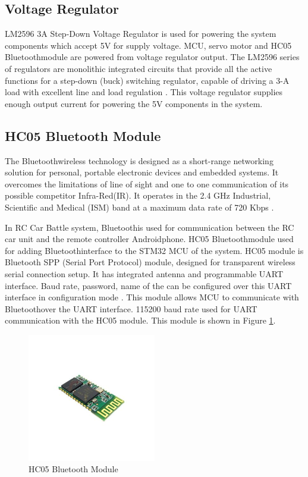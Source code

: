 \subsection{Voltage Regulator}
LM2596 3A Step-Down Voltage Regulator is used for powering the system components which accept 5V for supply voltage. MCU, servo motor and HC05 Bluetooth\texttrademark\;module are powered from voltage regulator output. The LM2596 series of regulators are monolithic
integrated circuits that provide all the active functions for a step-down (buck) switching regulator, capable of driving a 3-A load with excellent line and load
regulation \cite{Three}. This voltage regulator supplies enough output current for powering the 5V components in the system.

\subsection{HC05 Bluetooth Module} \label{sec_hc05_module}
The Bluetooth\texttrademark\;wireless technology is designed as a short-range networking solution for personal, portable electronic devices and embedded systems. It overcomes the limitations of line of sight and one to one communication of its possible competitor Infra-Red(IR). It operates in the 2.4 GHz Industrial, Scientific and Medical (ISM) band at a maximum data rate of 720 Kbps \cite{Bluetooth_Overview}.

In RC Car Battle system, Bluetooth\texttrademark\;is used for communication between the RC car unit and the remote controller Android\texttrademark\;phone. HC05 Bluetooth\texttrademark\;module used for adding Bluetooth\texttrademark\;interface to the STM32 MCU of the system. HC05 module is Bluetooth SPP (Serial Port Protocol) module, designed for transparent wireless serial connection setup. It has integrated antenna and programmable UART interface. Baud rate, password, name of the can be configured over this UART interface in configuration mode \cite{HC05_datasheet}. This module allows MCU to communicate with Bluetooth\texttrademark\;over the UART interface. 115200 baud rate used for UART communication with the HC05 module. This module is shown in Figure \ref{fig:hc05_module}. 

\begin{figure}[!htbp]
    \centering
    \includegraphics[width=0.5\textwidth]{Imgs/400px-HC-05.jpg}
    \caption{\label{fig:hc05_module}HC05 Bluetooth\texttrademark\; Module \cite{HC05_datasheet}}
\end{figure}

